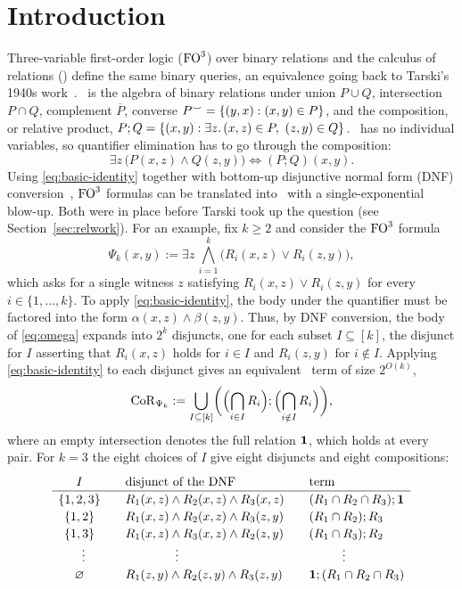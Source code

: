 \section{Introduction}
Three-variable first-order logic ($\mathrm{FO}^{3}$) over binary relations and the
calculus of relations
(\CoR) define the same binary queries, an equivalence going back to
Tarski's 1940s work~\citep{tarski-givant1987}. \CoR\ is the algebra of
binary relations under union $P\cup Q$, intersection $P\cap Q$, complement
$\overline P$, converse $P^\smile=\{ (y,x):(x,y)\in P \}$, and the
composition, or relative product,
$P;Q=\{ (x,y):\exists z.\,(x,z)\in P,\ (z,y)\in Q \}$. \CoR\ has no
individual variables, so quantifier elimination has to go through the
composition:
\begin{equation}\label{eq:basic-identity}
 \exists z\,\bigl(P(x,z)\land Q(z,y)\bigr)\iff(P;Q)(x,y).
\end{equation}
Using \eqref{eq:basic-identity} together with bottom-up disjunctive normal
form (DNF)
conversion~\citep{hilbert-ackermann1928,kleene1952,schoening1989},
$\mathrm{FO}^{3}$ formulas can be translated into \CoR\ with a single-exponential
blow-up. Both were in place before Tarski took up the question
(see Section~\ref{sec:relwork}). For an example, fix $k\ge2$ and consider the
$\mathrm{FO}^{3}$ formula
\begin{equation}\label{eq:omega}
\Psi_k(x,y) := \exists z\,\bigwedge_{i=1}^k
       \bigl(R_i(x,z)\lor R_i(z,y)\bigr),
\end{equation}
which asks for a single witness $z$ satisfying $R_i(x,z)\lor R_i(z,y)$ for
every $i\in\{1,\dots,k\}$. To apply \eqref{eq:basic-identity}, the body
under the quantifier must be factored into the form
$\alpha(x,z)\land\beta(z,y)$. Thus, by DNF conversion, the body of
\eqref{eq:omega} expands into $2^k$ disjuncts, one for each subset
$I\subseteq[k]$, the disjunct for $I$ asserting that $R_i(x,z)$ holds for
$i\in I$ and $R_i(z,y)$ for $i\notin I$. Applying
\eqref{eq:basic-identity} to each disjunct gives an equivalent \CoR\ term of
size $2^{O(k)}$,
\begin{equation}\label{eq:omega-upper}
 \mathrm{CoR}_{\Psi_k} := \bigcup_{I\subseteq[k]}
 \biggl(\Bigl(\bigcap_{i\in I}R_i\Bigr);\Bigl(\bigcap_{i\notin I}R_i\Bigr)\biggr),
\end{equation}
where an empty intersection denotes the full relation $\mathbf{1}$, which holds at
every pair. For $k=3$ the eight choices of $I$ give eight disjuncts and
eight compositions:
\[
\renewcommand{\arraystretch}{1.15}
\begin{array}{c@{\qquad}l@{\qquad}l}
 I&\text{disjunct of the DNF}&\text{term}\\\hline
 \{1,2,3\}&R_1(x,z)\land R_2(x,z)\land R_3(x,z)&(R_1\cap R_2\cap R_3);\one\\
 \{1,2\}&R_1(x,z)\land R_2(x,z)\land R_3(z,y)&(R_1\cap R_2);R_3\\
 \{1,3\}&R_1(x,z)\land R_3(x,z)\land R_2(z,y)&(R_1\cap R_3);R_2\\
 \ \ \vdots&\qquad\qquad\vdots&\qquad\ \ \vdots\\
 \varnothing&R_1(z,y)\land R_2(z,y)\land R_3(z,y)&\one;(R_1\cap R_2\cap R_3)
\end{array}
\]
